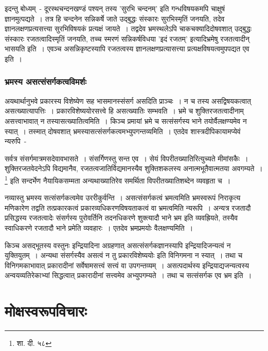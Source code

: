 		इदन्तु बोध्यम्~- दूरस्थचन्दनखण्डं पश्यन् तस्य 'सुरभि चन्दनम्' इति गन्धविषयकमपि चाक्षुषं ज्ञानमुत्पद्यते~। तत्र हि चन्दनेन सन्निकर्षे जाते उद्बुद्धः संस्कारः सुरभिस्मृतिं जनयति, तदेव ज्ञानलक्षणप्रत्यसत्त्या सुरभिविषयकं प्रत्यक्षं जायते~। तद्वदेव भ्रमस्थलेऽपि चाकचक्यादिदोषवशात् उद्बुद्धः संस्कारः रजतत्वादिस्मृतिं जनयति, तच्च स्मरणं सन्निकर्षविधया 'इदं रजतम्' इत्यादिभ्रमेषु रजतत्वादीन् भासयति इति~। एवञ्च असन्निकृष्टस्यापि रजतत्वस्य ज्ञानलक्षणप्रत्यासत्त्या प्रत्यक्षविषयत्वमुपपद्यत एव इति~।

		\subsubsection{भ्रमस्य असत्संसर्गकत्वविमर्शः}

		अयथार्थानुभवे प्रकारस्य विशेष्येण सह भासमानस्संसर्ग असदिति प्राञ्चः~। न च तस्य असद्विषयकत्वात् असत्ख्यात्यापत्तिः~। प्रकारविशेष्ययोरसत्त्वे हि असत्ख्यातिः सम्भवति~। भ्रमे च शुक्तिरजतत्वादीनाम् असत्त्वाभावात् न तस्यासत्ख्यातित्वमिति~। किञ्च प्रमायां भ्रमे च सत्संसर्गस्य भाने तयोर्वैलक्षण्यमेव न स्यात्~। तस्मात् दोषवशात् भ्रमस्यासत्संसर्गकत्वमभ्युपगन्तव्यमिति~। एतदेव शास्त्रदीपिकायामप्येवं न्यरुपि~-

		{\fontsize{11.7}{0}\selectfont\s सर्वत्र संसर्गमात्रमसदेवावभासते~। संसर्गिणस्तु सन्त एव~। सेयं विपरीतख्यातिरित्युच्यते मीमांसकैः~। शुक्तिरजतवेदनेऽपि विद्यमानैव, रजतत्वजातिर्विद्यमानस्यैव शुक्तिशकलस्य अनात्मभूतैवात्मतया अवगम्यते~।\footnote{शा. दी. ५८}} इति सन्दर्भेण नैयायिकसम्मता अन्यथाख्यातिरेव समर्थिता विपरीतख्यातिशब्देन व्यवहृता च~।

		नव्यास्तु भ्रमस्य सत्संसर्गकत्वमेव उररीकुर्वन्ति~। असत्संसर्गकत्वं भ्रमत्वमिति भ्रमस्वरूपं निराकृत्य मणिकारेण तद्वति तत्प्रकारकत्वं प्रकारव्यधिकरणविषयताकत्वं वा भ्रमत्वमिति न्यरूपि~। अन्यत्र रजतादौ प्रसिद्धस्य रजतत्वादेः संसर्गस्य पुरोवर्तिनि तदनधिकरणे शुक्त्यादौ भाने भ्रम इति व्यवह्रियते, तस्यैव स्वाधिकरणे रजतादौ भाने प्रमेति व्यवहारः~। एतदेव भ्रमप्रमयोः वैलक्षण्यमिति~।

		किञ्च असद्भूतस्य वस्तुनः‌ इन्द्रियादिना अग्रहणात् असत्संसर्गकज्ञानस्यापि इन्द्रियादिजन्यत्वं न युक्तियुतम्~। अन्यथा संसर्गस्यैव असत्वं न तु प्रकारविशेष्ययोः इति विनिगमना न स्यात्~। तथा च विनिगमकाभावात् प्रकारादीनां सर्वेषामसत्त्वं सत्त्वं वा उपगन्तव्यम्~। असत्पदार्थस्य इन्द्रियाद्यजन्यत्वस्य अन्वयव्यतिरेकाभ्यां सिद्धत्वात् प्रकारादीनां सत्त्वमेव अभ्युपगम्यते~। तथा च सत्संसर्गक एव भ्रम इति~।



	\section{मोक्षस्वरूपविचारः}

